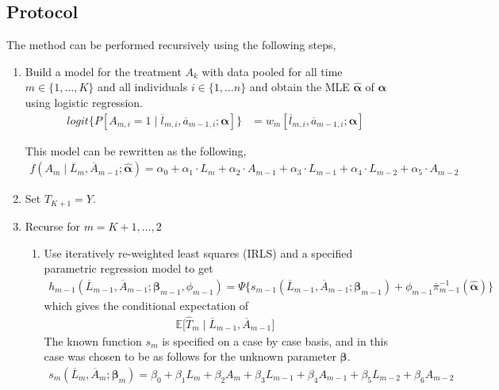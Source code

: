\subsection{Protocol} 
The method can be performed recursively using the following steps, 

\begin{enumerate}
\item Build a model for the treatment $A_k$ with data pooled for all time $m \in \{1, \dots, K \}$ and all individuals $i \in \{1, \dots n\}$ and obtain the MLE $\hat{\mathbf{\alpha}}$ of $\mathbf{\alpha}$ using logistic regression. 
\begin{align} 
logit\{P[A_{m,i} = 1 \mid \overline{l}_{m,i}, \overline{a}_{m-1,i}; \mathbf{\alpha}]\} &= w_m [\overline{l}_{m,i}, \overline{a}_{m-1,i}; \mathbf{\alpha}]
\end{align} 

This model can be rewritten as the following,  
\begin{align} 
f(A_m \mid \overline{L}_m, \overline{A}_{m-1}; \hat{\mathbf{\alpha}}) = \alpha_{0} + \alpha_{1} \cdot L_{m} + \alpha_{2} \cdot A_{m-1} + \alpha_{3} \cdot L_{m-1} + \alpha_{4} \cdot L_{m-2} + \alpha_{5} \cdot A_{m-2} 
\end{align} 

\item Set $\hat{T}_{K+1} = Y$.  

\item Recurse for $m = K+1, \dots, 2$ 
\begin{enumerate}
\item \label{modcreate} Use iteratively re-weighted least squares (IRLS) and a specified parametric regression model to get
\begin{align}
h_{m-1}(\overline{L}_{m-1}, \overline{A}_{m-1}; \mathbf{\beta}_{m-1}, \phi_{m-1}) = \Psi \{s_{m-1}(\overline{L}_{m-1}, \overline{A}_{m-1}; \mathbf{\beta}_{m-1}) + \phi_{m-1} \overline{\pi}_{m-1}^{-1} (\hat{\mathbf{\alpha}}) \}
\end{align}
which gives the conditional expectation of 
\begin{align}
\mathbb{E} \bigg[\hat{T}_m \mid \overline{L}_{m-1}, \overline{A}_{m-1} \bigg]
\end{align} 
The known function $s_{m}$ is specified on a case by case basis, and in this case was chosen to be as follows for the unknown parameter $\mathbf{\beta}$.  
\begin{align}
s_{m}(\overline{L}_{m}, \overline{A}_{m};\mathbf{\beta}_{m}) = \beta_0 + \beta_1 L_{m} +\beta_2 A_{m} + \beta_3 L_{m-1} +\beta_4 A_{m-1}+ \beta_5 L_{m-2} +\beta_6 A_{m-2}
\end{align}


\end{enumerate}
\end{enumerate}
